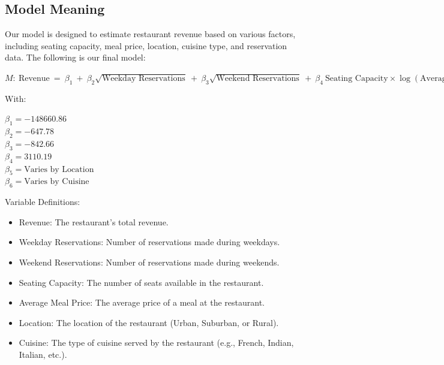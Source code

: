 \subsection{Model Meaning}

Our model is designed to estimate restaurant revenue based on various factors, including seating capacity, meal price, location, cuisine type, and reservation data. The following is our final model:

\begin{center}
$
M: \ \text{Revenue} \ = \ \beta_1 \ + \ \beta_2 \sqrt{\text{Weekday Reservations}} \ + \ \beta_3 \sqrt{\text{Weekend Reservations}} \ + \ \beta_4 \ \text{Seating Capacity} \times \log(\text{Average Meal Price}) \ + \ \beta_5 \ \text{Seating Capacity} \times \text{Location} \ + \ \beta_6 \ \log(\text{Average Meal Price}) \times \text{Cuisine} \ + \ \epsilon
$
\end{center}

With:

\begin{center}
    $\beta_1 = -148660.86$ \\
    $\beta_2 = -647.78$ \\
    $\beta_3 = -842.66$ \\
    $\beta_4 = 3110.19$ \\
    $\beta_5 = \text{Varies by Location}$ \\
    $\beta_6 = \text{Varies by Cuisine}$
\end{center}

Variable Definitions:

\begin{itemize}
    \item Revenue: The restaurant's total revenue.
    \item Weekday Reservations: Number of reservations made during weekdays.
    \item Weekend Reservations: Number of reservations made during weekends.
    \item Seating Capacity: The number of seats available in the restaurant.
    \item Average Meal Price: The average price of a meal at the restaurant.
    \item Location: The location of the restaurant (Urban, Suburban, or Rural).
    \item Cuisine: The type of cuisine served by the restaurant (e.g., French, Indian, Italian, etc.).
\end{itemize}

